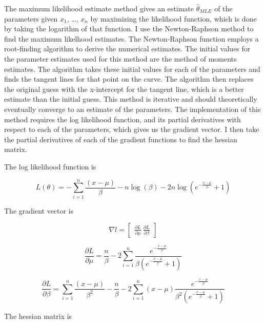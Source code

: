 \documentclass{svproc}
\begin{document}
The maximum likelihood estimate method gives an estimate $\hat{\theta}_{MLE}$ of the parameters given $x_1$, \ldots, $x_n$ by maximizing the likelihood function, which is done by taking the logarithm of that function. I use the Newton-Raphson method to find the maximum likelhood estimates. The Newton-Raphson function employs a root-finding algorithm to derive the numerical estimates. The initial values for the parameter estimates used for this method are the method of moments estimates. The algorithm takes these initial values for each of the parameters and finds the tangent lines for that point on the curve. The algorithm then replaces the original guess with the x-intercept for the tangent line, which is a better estimate than the initial guess. This method is iterative and should theoretically eventually converge to an estimate of the parameters. The implementation of this method requires the log likelihood function, and its partial derivatives with respect to each of the parameters, which gives us the gradient vector. I then take the partial derivatives of each of the gradient functions to find the hessian matrix. 

The log likelihood function is

\begin{equation}
L(\theta) = -\sum_{i=1}^{n} \frac{(x-\mu)}{\beta} - n \log(\beta) - 2 n \log(e^{-\frac{x-\mu}{\beta }} + 1)
\label{2.1}
\end{equation}

The gradient vector is 

{\large
$$
\nabla l = \begin{bmatrix} \frac{\partial L}{\partial \mu} \ \frac{\partial L}{\partial \beta}\end{bmatrix}
$$}

{\scriptsize
\begin{equation}
\frac{\partial L}{\partial \mu} = \frac{n}{\beta} - 2 \sum_{i=1}^{n} \frac{e^{-\frac{x-\mu}{\beta}}}{\beta (e^{-\frac{x-\mu}{\beta}}+1)}
\label{2.2}
\end{equation}}

{\scriptsize
\begin{equation}
\frac{\partial L}{\partial \beta} = \sum_{i=1}^{n} \frac{(x-\mu)}{\beta^2} - \frac{n}{\beta} - 2 \sum_{i=1}^{n} (x-\mu) \frac{e^{-\frac{x-\mu}{\beta}}}{\beta^2(e^{-\frac{x-\mu}{\beta}}+1)}
\label{2.3}
\end{equation}}

The hessian matrix is

\makeatletter
\renewcommand*\env@matrix[1][\arraystretch]{%
  \edef\arraystretch{#1}%
  \hskip -\arraycolsep
  \let\@ifnextchar\new@ifnextchar
  \array{*\c@MaxMatrixCols c}}
\makeatother
\end{document}
